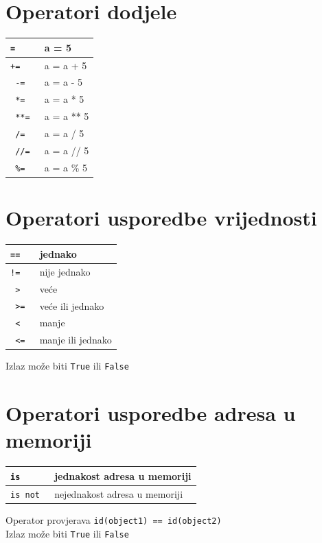 \documentclass[10pt]{article}
\begin{document}
    \section*{\color{NavyBlue} Operatori dodjele}
    \begin{tabular}{|>{\tt}p{9.00cm}|>{}p{15.50cm}|}
        \hline
        =   & a = 5             \\ \hline
        +=  & a = a + 5         \\ \hline
        -=  & a = a - 5         \\ \hline
        *=  & a = a * 5         \\ \hline
        **= & a = a ** 5        \\ \hline
        /=  & a = a / 5         \\ \hline
        //= & a = a // 5        \\ \hline
        \%= & a = a \% 5        \\ \hline
    \end{tabular}

    \section*{\color{NavyBlue} Operatori usporedbe vrijednosti}
    \begin{tabular}{|>{\tt}p{9.00cm}|>{}p{15.50cm}|}
        \hline
        ==      & jednako           \\ \hline
        !=      & nije jednako      \\ \hline
        >       & veće              \\ \hline
        >=      & veće ili jednako  \\ \hline
        <       & manje             \\ \hline
        <=      & manje ili jednako \\ \hline
    \end{tabular}
    \begin{center}
        \footnotesize
        Izlaz može biti \texttt{True} ili \texttt{False}
    \end{center}

    \section*{\color{NavyBlue} Operatori usporedbe adresa u memoriji}
    \begin{tabular}{|>{\tt}p{9.00cm}|>{}p{15.50cm}|}
        \hline
        is      & jednakost adresa u memoriji \\ \hline
        is not  & nejednakost adresa u memoriji \\ \hline
    \end{tabular}
    \begin{center}
        \footnotesize
        Operator provjerava \texttt{id(object1) == id(object2)} \\
        Izlaz može biti \texttt{True} ili \texttt{False}
    \end{center}
\end{document}
